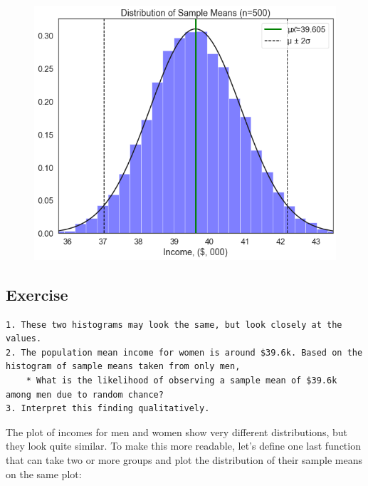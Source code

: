 \documentclass[
  letterpaper,
  DIV=11,
  numbers=noendperiod]{scrreprt}
\begin{document}
\begin{figure}[H]

{\centering \includegraphics{notebooks/W07. Distributions and Basic Statistics_files/figure-pdf/cell-27-output-2.png}

}

\end{figure}

\hypertarget{exercise-23}{%
\subsection{Exercise}\label{exercise-23}}

\begin{verbatim}
1. These two histograms may look the same, but look closely at the values. 
2. The population mean income for women is around $39.6k. Based on the histogram of sample means taken from only men, 
    * What is the likelihood of observing a sample mean of $39.6k among men due to random chance?
3. Interpret this finding qualitatively.
\end{verbatim}

The plot of incomes for men and women show very different distributions,
but they look quite similar. To make this more readable, let's define
one last function that can take two or more groups and plot the
distribution of their sample means on the same plot:
\end{document}
